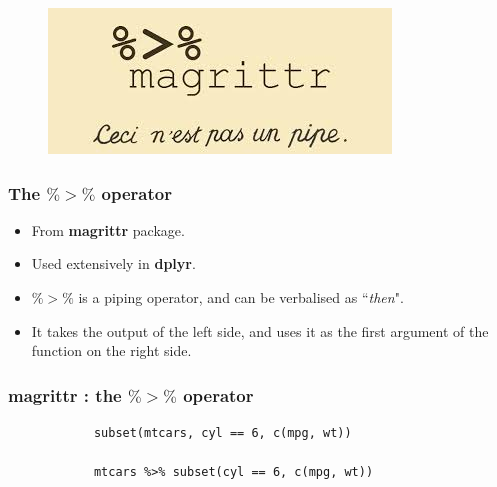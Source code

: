 \documentclass{beamer}
\begin{document}
	\begin{frame}
		\begin{figure}
			\centering
			\includegraphics[width=0.99\linewidth]{images/pipe2}
			
		\end{figure}
		
	\end{frame}
	\begin{frame}[fragile]
		\frametitle{ The $\%>\%$ operator}
		\LARGE
		\begin{itemize}
			\item From \textbf{magrittr} package. 
			\item Used extensively in \textbf{dplyr}.
			\item $\%>\%$ is a piping operator, and can be verbalised as ``\textit{then}".
			\item It takes the output of the left side, and uses it as the first
			argument of the function on the right side.
		\end{itemize}
	\end{frame}
	\begin{frame}[fragile]
		\frametitle{magrittr :  the $\%>\%$ operator}
		\Large
		\begin{framed}
			\begin{verbatim}
			subset(mtcars, cyl == 6, c(mpg, wt))
			
			mtcars %>% subset(cyl == 6, c(mpg, wt))
			\end{verbatim}
		\end{framed}
		
	\end{frame}
	
\end{document}
